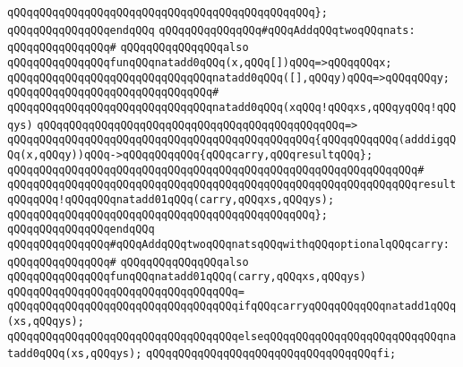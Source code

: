 \verb|qQQqqQQqqQQqqQQqqQQqqQQqqQQqqQQqqQQqqQQqqQQqqQQq};|\newline
\verb|qQQqqQQqqQQqqQQqendqQQq|\newline
\newline
\verb|qQQqqQQqqQQqqQQq#qQQqAddqQQqtwoqQQqnats:|\newline
\verb|qQQqqQQqqQQqqQQq#|\newline
\verb|qQQqqQQqqQQqqQQqalso|\newline
\verb|qQQqqQQqqQQqqQQqfunqQQqnatadd0qQQq(x,qQQq[])qQQq=>qQQqqQQqx;|\newline
\verb|qQQqqQQqqQQqqQQqqQQqqQQqqQQqqQQqnatadd0qQQq([],qQQqy)qQQq=>qQQqqQQqy;|\newline
\verb|qQQqqQQqqQQqqQQqqQQqqQQqqQQqqQQq#|\newline
\verb|qQQqqQQqqQQqqQQqqQQqqQQqqQQqqQQqnatadd0qQQq(xqQQq!qQQqxs,qQQqyqQQq!qQQqys)|\newline
\verb|qQQqqQQqqQQqqQQqqQQqqQQqqQQqqQQqqQQqqQQqqQQqqQQq=>|\newline
\verb|qQQqqQQqqQQqqQQqqQQqqQQqqQQqqQQqqQQqqQQqqQQqqQQq{qQQqqQQqqQQq(adddigqQQq(x,qQQqy))qQQq->qQQqqQQqqQQq{qQQqcarry,qQQqresultqQQq};|\newline
\verb|qQQqqQQqqQQqqQQqqQQqqQQqqQQqqQQqqQQqqQQqqQQqqQQqqQQqqQQqqQQqqQQq#|\newline
\verb|qQQqqQQqqQQqqQQqqQQqqQQqqQQqqQQqqQQqqQQqqQQqqQQqqQQqqQQqqQQqqQQqresultqQQqqQQq!qQQqqQQqnatadd01qQQq(carry,qQQqxs,qQQqys);|\newline
\verb|qQQqqQQqqQQqqQQqqQQqqQQqqQQqqQQqqQQqqQQqqQQqqQQq};|\newline
\verb|qQQqqQQqqQQqqQQqendqQQq|\newline
\newline
\verb|qQQqqQQqqQQqqQQq#qQQqAddqQQqtwoqQQqnatsqQQqwithqQQqoptionalqQQqcarry:|\newline
\verb|qQQqqQQqqQQqqQQq#|\newline
\verb|qQQqqQQqqQQqqQQqalso|\newline
\verb|qQQqqQQqqQQqqQQqfunqQQqnatadd01qQQq(carry,qQQqxs,qQQqys)|\newline
\verb|qQQqqQQqqQQqqQQqqQQqqQQqqQQqqQQqqQQq=|\newline
\verb|qQQqqQQqqQQqqQQqqQQqqQQqqQQqqQQqqQQqifqQQqcarryqQQqqQQqqQQqnatadd1qQQq(xs,qQQqys);|\newline
\verb|qQQqqQQqqQQqqQQqqQQqqQQqqQQqqQQqqQQqelseqQQqqQQqqQQqqQQqqQQqqQQqqQQqnatadd0qQQq(xs,qQQqys);|\newline
\verb|qQQqqQQqqQQqqQQqqQQqqQQqqQQqqQQqqQQqfi;|\newline
